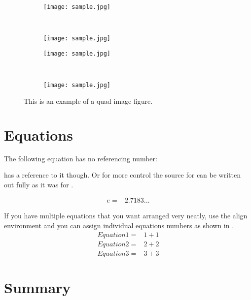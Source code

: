   \begin{figure}[!htb]
    \centering
    \begin{subfigure}{0.45\textwidth}
      \texttt{[image: sample.jpg]}
      \caption{} %
      \label{fig5:quadImage:a}
    \end{subfigure}
    ~ %
    \begin{subfigure}{0.45\textwidth}
      \texttt{[image: sample.jpg]}
      \caption{} %
      \label{fig5:quadImage:b}
    \end{subfigure}
    \par\vspace{1em} %
    \begin{subfigure}{0.45\textwidth}
      \texttt{[image: sample.jpg]}
      \caption{} %
      \label{fig5:quadImage:c}
    \end{subfigure}
    ~ %
    \begin{subfigure}{0.45\textwidth}
      \texttt{[image: sample.jpg]}
      \caption{} %
      \label{fig5:quadImage:d}
    \end{subfigure}
    \caption{This is an example of a quad image figure.}
    \label{fig5:quadImage}
  \end{figure}
  
  \clearpage %
  \section{Equations}
  The following equation has no referencing number:
  
   has a reference to it though. Or for more control the source for  can be written out fully as it was for .
  
  \begin{align}\label{eq:quickEq2}
    e = & 2.7183...
  \end{align}
  
  If you have multiple equations that you want arranged very neatly, use the align environment and you can assign individual equations numbers as shown in .
  \begin{align}%
    \label{eq:multiref:a} Equation1 = & 1 + 1\\
    \label{eq:multiref:b} Equation2 = & 2 + 2\\
    \label{eq:multiref:c} Equation3 = & 3 + 3
  \end{align}
  
  
  
  \printreferences %

\section{Summary}
